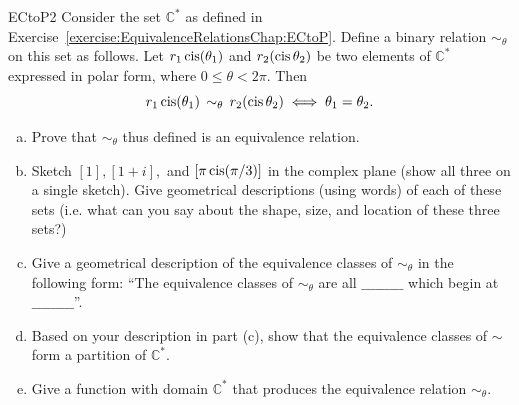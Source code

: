\begin{exercise}{ECtoP2}
Consider the set $\mathbb{C}^*$ as defined in Exercise~\ref{exercise:EquivalenceRelationsChap:ECtoP}. Define a binary relation $\sim_{\theta}$ on this set as follows.  Let $ r_1 \operatorname{cis}(\theta_1)$ and $r_2(\operatorname{cis} \theta_2)$  be two elements of $\mathbb{C}^*$ expressed in polar form, where $0 \le \theta < 2\pi$. Then
\[ r_1 \operatorname{cis}(\theta_1) \, \sim_{\theta} \, r_2(\operatorname{cis} \theta_2)  \iff \theta_1 = \theta_2.\]

\begin{enumerate}[(a)]
\item
Prove that $\sim_{\theta}$ thus defined is an equivalence relation.
\item
Sketch $[1], [1+i],$  and $[\pi \operatorname{cis}(\pi/3)]$ in the complex plane (show all three on a single sketch). Give geometrical descriptions (using words) of each of these sets (i.e. what can you say about the shape, size, and location of these three sets?)
\item 
Give a geometrical description of the equivalence classes of $\sim_{\theta}$ in the following form:  ``The equivalence classes of $\sim_{\theta}$ are all $\_\_\_\_\_\_\_\_\_$ which begin at $\_\_\_\_\_\_\_\_\_$''.
\item
Based on your description in part (c), show that the equivalence classes of $\sim$ form a partition of $\mathbb{C}^*$.
\item
Give a function with domain $\mathbb{C}^*$ that produces the equivalence relation $\sim_{\theta}$. 
\end{enumerate}
\end{exercise}



